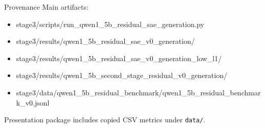 \documentclass[aspectratio=169]{beamer}
\begin{document}
\begin{frame}{Provenance}
  \small
  Main artifacts:
  \begin{itemize}
    \item stage3/scripts/run\_qwen1\_5b\_residual\_sae\_generation.py
    \item stage3/results/qwen1\_5b\_residual\_sae\_v0\_generation/
    \item stage3/results/qwen1\_5b\_residual\_sae\_v0\_generation\_low\_l1/
    \item stage3/results/qwen1\_5b\_second\_stage\_residual\_v0\_generation/
    \item stage3/data/qwen1\_5b\_residual\_benchmark/qwen1\_5b\_residual\_benchmark\_v0.jsonl
  \end{itemize}

  \vspace{0.5em}
  Presentation package includes copied CSV metrics under \texttt{data/}.
\end{frame}
\end{document}
